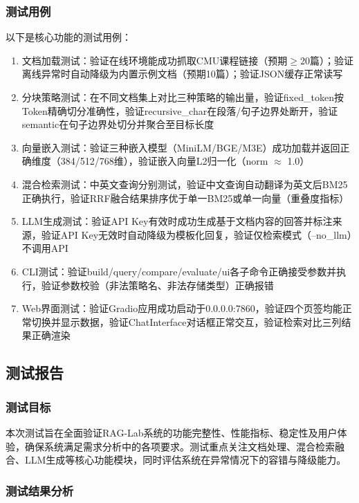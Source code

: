 \documentclass[10pt,a4paper]{article}
\begin{document}
\subsubsection{测试用例}

以下是核心功能的测试用例：
\begin{enumerate}[label=(\arabic*)]
\item 文档加载测试：验证在线环境能成功抓取CMU课程链接（预期$\geq$20篇）；验证离线异常时自动降级为内置示例文档（预期10篇）；验证JSON缓存正常读写
\item 分块策略测试：在不同文档集上对比三种策略的输出量，验证fixed\_token按Token精确切分准确性，验证recursive\_char在段落/句子边界处断开，验证semantic在句子边界处切分并聚合至目标长度
\item 向量嵌入测试：验证三种嵌入模型（MiniLM/BGE/M3E）成功加载并返回正确维度（384/512/768维），验证嵌入向量L2归一化（norm $\approx$ 1.0）
\item 混合检索测试：中英文查询分别测试，验证中文查询自动翻译为英文后BM25正确执行，验证RRF融合结果排序优于单一BM25或单一向量（重叠度指标）
\item LLM生成测试：验证API Key有效时成功生成基于文档内容的回答并标注来源，验证API Key无效时自动降级为模板化回复，验证仅检索模式（--no\_llm）不调用API
\item CLI测试：验证build/query/compare/evaluate/ui各子命令正确接受参数并执行，验证参数校验（非法策略名、非法存储类型）正确报错
\item Web界面测试：验证Gradio应用成功启动于0.0.0.0:7860，验证四个页签均能正常切换并显示数据，验证ChatInterface对话框正常交互，验证检索对比三列结果正确渲染
\end{enumerate}

\subsection{测试报告}

\subsubsection{测试目标}

本次测试旨在全面验证RAG-Lab系统的功能完整性、性能指标、稳定性及用户体验，确保系统满足需求分析中的各项要求。测试重点关注文档处理、混合检索融合、LLM生成等核心功能模块，同时评估系统在异常情况下的容错与降级能力。

\subsubsection{测试结果分析}
\end{document}
